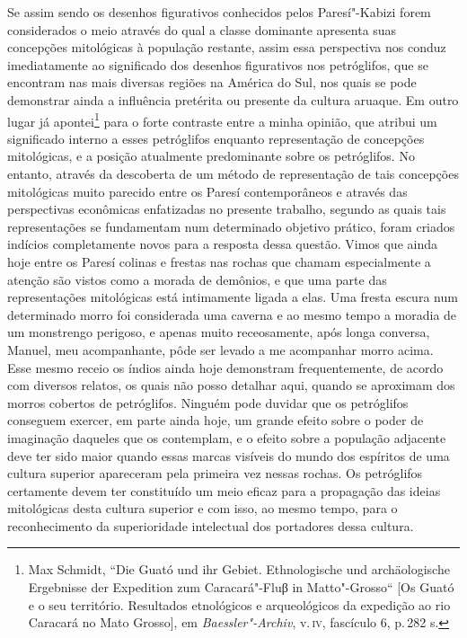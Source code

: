 Se assim sendo os desenhos figurativos conhecidos pelos Paresí"-Kabizi
forem considerados o meio através do qual a classe dominante apresenta
suas concepções mitológicas à população restante, assim essa
perspectiva nos conduz imediatamente ao significado dos desenhos
figurativos nos petróglifos, que se encontram nas mais diversas regiões
na América do Sul, nos quais se pode demonstrar ainda a influência
pretérita ou presente da cultura aruaque. Em outro lugar já
apontei\footnote{Max Schmidt, ``Die Guató und ihr Gebiet. Ethnologische
  und archäologische Ergebnisse der Expedition zum Caracará"-Fluβ in
  Matto"-Grosso`` {[}Os Guató e o seu território. Resultados etnológicos
  e arqueológicos da expedição ao rio Caracará no Mato Grosso{]}, em
  \textit{Baessler"-Archiv}, v.\,\textsc{iv}, fascículo 6, p.\,282 s.} para o forte
contraste entre a minha opinião, que atribui um significado interno a
esses petróglifos enquanto representação de concepções mitológicas, e a
posição atualmente predominante sobre os petróglifos. No entanto,
através da descoberta de um método de representação de tais concepções
mitológicas muito parecido entre os Paresí contemporâneos e através das
perspectivas econômicas enfatizadas no presente trabalho, segundo as
quais tais representações se fundamentam num determinado objetivo
prático, foram criados indícios completamente novos para a resposta
dessa questão. Vimos que ainda hoje entre os Paresí colinas e frestas
nas rochas que chamam especialmente a atenção são vistos como a morada
de demônios, e que uma parte das representações mitológicas está
intimamente ligada a elas. Uma fresta escura num determinado morro foi
considerada uma caverna e ao mesmo tempo a moradia de um monstrengo
perigoso, e apenas muito receosamente, após longa conversa, Manuel, meu
acompanhante, pôde ser levado a me acompanhar morro acima. Esse mesmo
receio os índios ainda hoje demonstram frequentemente, de acordo com
diversos relatos, os quais não posso detalhar aqui, quando se aproximam
dos morros cobertos de petróglifos. Ninguém pode duvidar que os
petróglifos conseguem exercer, em parte ainda hoje, um grande efeito
sobre o poder de imaginação daqueles que os contemplam, e o efeito
sobre a população adjacente deve ter sido maior quando essas marcas
visíveis do mundo dos espíritos de uma cultura superior apareceram pela
primeira vez nessas rochas. Os petróglifos certamente devem ter
constituído um meio eficaz para a propagação das ideias mitológicas
desta cultura superior e com isso, ao mesmo tempo, para o reconhecimento
da superioridade intelectual dos portadores dessa cultura.



